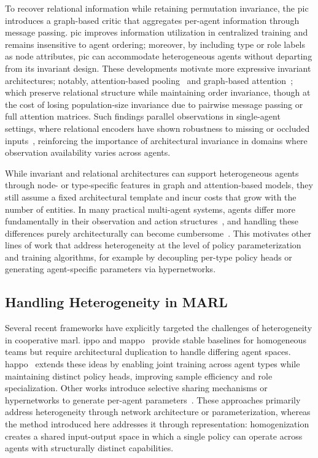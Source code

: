 \documentclass[]{jair}
\begin{document}
To recover relational information while retaining permutation invariance, 
the \gls{pic}~\cite{liu2020b} introduces a graph-based critic that aggregates 
per-agent information through message passing. \Gls{pic} improves information 
utilization in centralized training and remains insensitive to agent ordering; 
moreover, by including type or role labels as node attributes, \gls{pic} can 
accommodate heterogeneous agents without departing from its invariant design. 
These developments motivate more expressive invariant architectures; notably, 
attention-based pooling~\cite{zambaldi2018} and graph-based attention~\cite{hao2023};
which preserve relational structure while maintaining order invariance, 
though at the cost of losing population-size invariance due to pairwise 
message passing or full attention matrices. Such findings parallel observations 
in single-agent settings, where relational encoders have shown robustness 
to missing or occluded inputs~\cite{tang2021}, reinforcing the 
importance of architectural invariance in domains where observation 
availability varies across agents.

While invariant and relational architectures can support heterogeneous agents
through node- or type-specific features in graph and attention-based models,
they still assume a fixed architectural template and incur costs that 
grow with the number of entities. In many practical multi-agent systems, 
agents differ more fundamentally in their observation and action 
structures~\cite{calvo2018}, and handling these differences purely 
architecturally can become cumbersome~\cite{cao2012, canese2021, hao2023}. 
This motivates other lines of work that address heterogeneity at 
the level of policy parameterization and training algorithms, 
for example by decoupling per-type policy heads or generating 
agent-specific parameters via hypernetworks.

\subsection{Handling Heterogeneity in MARL}

Several recent frameworks have explicitly targeted the challenges of heterogeneity 
in cooperative \gls{marl}. \Gls{ippo} and \gls{mappo}~\cite{yu2022} 
provide stable baselines for homogeneous teams but require architectural duplication 
to handle differing agent spaces. \Gls{happo}~\cite{zhong2024} 
extends these ideas by enabling joint training across agent types while maintaining 
distinct policy heads, improving sample efficiency and role specialization.
Other works introduce selective sharing mechanisms or hypernetworks to generate 
per-agent parameters~\cite{hao2023, witt2020}. These approaches primarily 
address heterogeneity through network architecture or parameterization, 
whereas the method introduced here addresses it through representation: 
homogenization creates a shared input-output space in which a single 
policy can operate across agents with structurally distinct capabilities.
\end{document}

